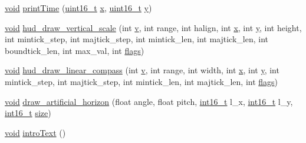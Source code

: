 \begin{DoxyCompactItemize}
\item 
\hyperlink{group___n_a_m_e_ga18028b8badbf1ea7e704ccac3c488e82}{void} \hyperlink{group___o_s_d_g_e_n_module_ga8b0f8e99f2bfee4a902a9d46a8714579}{print\-Time} (\hyperlink{stdint_8h_a273cf69d639a59973b6019625df33e30}{uint16\-\_\-t} \hyperlink{pios__opahrs__proto_8h_ad0da36b2558901e21e7a30f6c227a45e}{x}, \hyperlink{stdint_8h_a273cf69d639a59973b6019625df33e30}{uint16\-\_\-t} \hyperlink{pios__opahrs__proto_8h_aa4f0d3eebc3c443f9be81bf48561a217}{y})
\item 
\hyperlink{group___n_a_m_e_ga18028b8badbf1ea7e704ccac3c488e82}{void} \hyperlink{group___o_s_d_g_e_n_module_ga03d95a090f293be5c864ee5334d3c287}{hud\-\_\-draw\-\_\-vertical\-\_\-scale} (int \hyperlink{pios__opahrs__proto_8h_a9ff4f5e7fab61b60356262e4f382a906}{v}, int range, int halign, int \hyperlink{pios__opahrs__proto_8h_ad0da36b2558901e21e7a30f6c227a45e}{x}, int \hyperlink{pios__opahrs__proto_8h_aa4f0d3eebc3c443f9be81bf48561a217}{y}, int height, int mintick\-\_\-step, int majtick\-\_\-step, int mintick\-\_\-len, int majtick\-\_\-len, int boundtick\-\_\-len, int max\-\_\-val, int \hyperlink{group___u_a_v_ga89997860157be94711355010fc2a337d}{flags})
\item 
\hyperlink{group___n_a_m_e_ga18028b8badbf1ea7e704ccac3c488e82}{void} \hyperlink{group___o_s_d_g_e_n_module_ga1598b1881ca23bff8a3df4c896ed4869}{hud\-\_\-draw\-\_\-linear\-\_\-compass} (int \hyperlink{pios__opahrs__proto_8h_a9ff4f5e7fab61b60356262e4f382a906}{v}, int range, int width, int \hyperlink{pios__opahrs__proto_8h_ad0da36b2558901e21e7a30f6c227a45e}{x}, int \hyperlink{pios__opahrs__proto_8h_aa4f0d3eebc3c443f9be81bf48561a217}{y}, int mintick\-\_\-step, int majtick\-\_\-step, int mintick\-\_\-len, int majtick\-\_\-len, int \hyperlink{group___u_a_v_ga89997860157be94711355010fc2a337d}{flags})
\item 
\hyperlink{group___n_a_m_e_ga18028b8badbf1ea7e704ccac3c488e82}{void} \hyperlink{group___o_s_d_g_e_n_module_gab0e4e7223434b0cf8dd683461136fcd2}{draw\-\_\-artificial\-\_\-horizon} (float angle, float pitch, \hyperlink{stdint_8h_aa343fa3b3d06292b959ffdd4c4703b06}{int16\-\_\-t} l\-\_\-x, \hyperlink{stdint_8h_aa343fa3b3d06292b959ffdd4c4703b06}{int16\-\_\-t} l\-\_\-y, \hyperlink{stdint_8h_aa343fa3b3d06292b959ffdd4c4703b06}{int16\-\_\-t} \hyperlink{pios__opahrs__proto_8h_ae5dc6ffcd9b7605c7787791e40cc6bb0}{size})
\item 
\hyperlink{group___n_a_m_e_ga18028b8badbf1ea7e704ccac3c488e82}{void} \hyperlink{group___o_s_d_g_e_n_module_ga637c8a1ae3f761c2724cebbe6f92cce6}{intro\-Text} ()

\end{DoxyCompactItemize}
